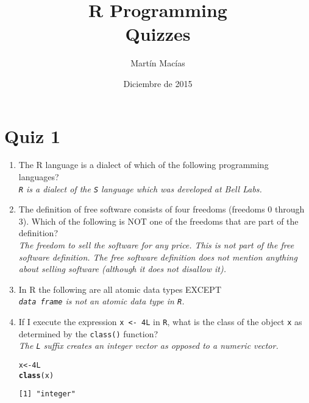 \documentclass{article}\usepackage[]{graphicx}\usepackage[]{color}
\title{R Programming\\ Quizzes}
\author{Martín Macías}
\date{Diciembre de 2015}
\makeatletter
\newcommand{\hlnum}[1]{\textcolor[rgb]{0.686,0.059,0.569}{#1}}%
\newcommand{\hlstd}[1]{\textcolor[rgb]{0.345,0.345,0.345}{#1}}%
\newcommand{\hlkwb}[1]{\textcolor[rgb]{0.69,0.353,0.396}{#1}}%
\newcommand{\hlkwd}[1]{\textcolor[rgb]{0.737,0.353,0.396}{\textbf{#1}}}%
\newenvironment{kframe}{%
 \def\at@end@of@kframe{}%
 \ifinner\ifhmode%
  \def\at@end@of@kframe{\end{minipage}}%
  \begin{minipage}{\columnwidth}%
 \fi\fi%
 \def\FrameCommand##1{\hskip\@totalleftmargin \hskip-\fboxsep
 \colorbox{shadecolor}{##1}\hskip-\fboxsep
     \hskip-\linewidth \hskip-\@totalleftmargin \hskip\columnwidth}%
 \MakeFramed {\advance\hsize-\width
   \@totalleftmargin\z@ \linewidth\hsize
   \@setminipage}}%
 {\par\unskip\endMakeFramed%
 \at@end@of@kframe}
\newenvironment{knitrout}{}{} %
\makeatother
\begin{document}
\maketitle

\section{Quiz 1}
\begin{enumerate}
  \item The R language is a dialect of which of the following programming languages?\\
  \textit{\texttt{R} is a dialect of the \texttt{S} language which was developed at Bell Labs.}
  
    \item The definition of free software consists of four freedoms (freedoms 0 through 3). Which of the following is NOT one of the freedoms that are part of the definition?\\
  \textit{The freedom to sell the software for any price. This is not part of the free software definition. The free software definition does not mention anything about selling software (although it does not disallow it).}
  
  \item In R the following are all atomic data types EXCEPT\\
  \textit{\texttt{data frame} is not an atomic data type in \texttt{R}.}
  
  \item If I execute the expression \texttt{x <- 4L} in \texttt{R}, what is the class of the object \texttt{x} as determined by the \texttt{class()} function?\\
  \textit{The \texttt{L} suffix creates an integer vector as opposed to a numeric vector.}
\begin{knitrout}
\color{fgcolor}\begin{kframe}
\begin{alltt}
  \hlstd{x} \hlkwb{<-} \hlnum{4L}
  \hlkwd{class}\hlstd{(x)}
\end{alltt}
\begin{verbatim}
[1] "integer"
\end{verbatim}
\end{kframe}
\end{knitrout}


\end{enumerate}
\end{document}
